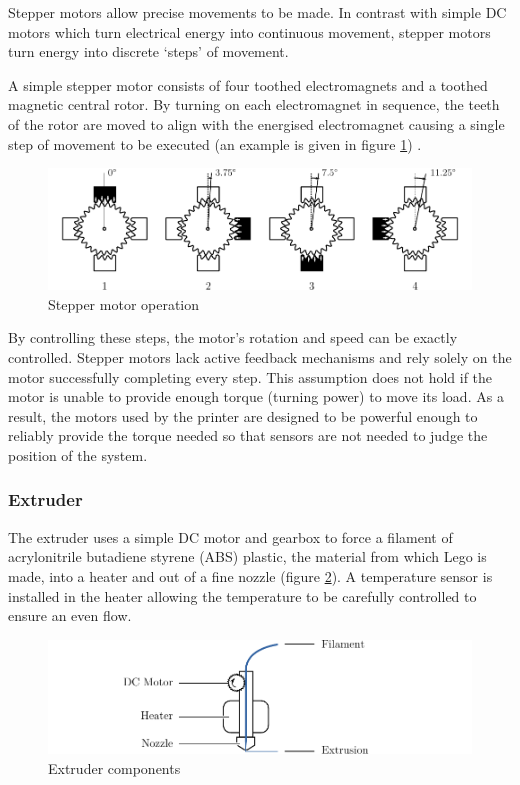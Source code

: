 				Stepper motors allow precise movements to be made. In contrast with
				simple DC motors which turn electrical energy into continuous movement,
				stepper motors turn energy into discrete `steps' of movement.
				
				A simple stepper motor consists of four toothed electromagnets and a
				toothed magnetic central rotor. By turning on each electromagnet in
				sequence, the teeth of the rotor are moved to align with the energised
				electromagnet causing a single step of movement to be executed (an
				example is given in figure \ref{fig:stepperMotor}) \cite{steppers101}.
				
				\begin{figure}
					\includegraphics[width=1\textwidth]{diagrams/stepperMotor.pdf}
					\caption{Stepper motor operation}
					\label{fig:stepperMotor}
				\end{figure}
				
				By controlling these steps, the motor's rotation and speed can be
				exactly controlled. Stepper motors lack active feedback mechanisms and
				rely solely on the motor successfully completing every step. This
				assumption does not hold if the motor is unable to provide enough torque
				(turning power) to move its load. As a result, the motors used by the
				printer are designed to be powerful enough to reliably provide the
				torque needed so that sensors are not needed to judge the position of
				the system.
				
			\subsubsection{Extruder}
				
				The extruder uses a simple DC motor and gearbox to force a filament of
				acrylonitrile butadiene styrene (ABS) plastic, the material from which
				Lego is made, into a heater and out of a fine nozzle (figure
				\ref{fig:extruder}).  A temperature sensor is installed in the heater
				allowing the temperature to be carefully controlled to ensure an even
				flow.
				
				\begin{figure}
					\includegraphics[width=1\textwidth]{diagrams/extruder.pdf}
					\caption{Extruder components}
					\label{fig:extruder}
				\end{figure}
				
